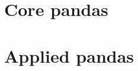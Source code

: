 \documentclass[openany]{book}
\begin{document}
\mainmatter
\part{Core pandas}
% 
% 
% 


\part{Applied pandas}



\end{document}
